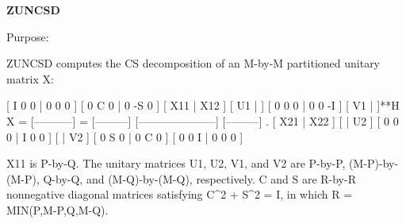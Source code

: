 {\bfseries Z\+U\+N\+C\+S\+D} 

 \begin{DoxyParagraph}{Purpose\+: }
\begin{DoxyVerb} ZUNCSD computes the CS decomposition of an M-by-M partitioned
 unitary matrix X:

                                 [  I  0  0 |  0  0  0 ]
                                 [  0  C  0 |  0 -S  0 ]
     [ X11 | X12 ]   [ U1 |    ] [  0  0  0 |  0  0 -I ] [ V1 |    ]**H
 X = [-----------] = [---------] [---------------------] [---------]   .
     [ X21 | X22 ]   [    | U2 ] [  0  0  0 |  I  0  0 ] [    | V2 ]
                                 [  0  S  0 |  0  C  0 ]
                                 [  0  0  I |  0  0  0 ]

 X11 is P-by-Q. The unitary matrices U1, U2, V1, and V2 are P-by-P,
 (M-P)-by-(M-P), Q-by-Q, and (M-Q)-by-(M-Q), respectively. C and S are
 R-by-R nonnegative diagonal matrices satisfying C^2 + S^2 = I, in
 which R = MIN(P,M-P,Q,M-Q).\end{DoxyVerb}
 
\end{DoxyParagraph}

